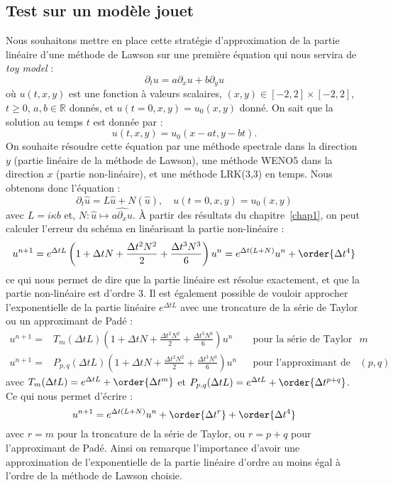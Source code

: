 \subsection{Test sur un modèle jouet}

Nous souhaitons mettre en place cette stratégie d'approximation de la partie linéaire d'une méthode de Lawson sur une première équation qui nous servira de \emph{toy model} :
$$
  \partial_t u = a\partial_x u + b\partial_y u
$$
où $u(t,x,y)$ est une fonction à valeurs scalaires, $(x,y)\in[-2,2]\times[-2,2]$, $t\geq0$, $a,b\in\mathbb{R}$ donnés, et $u(t=0,x,y)=u_0(x,y)$ donné. On sait que la solution au temps $t$ est donnée par :
$$
  u(t,x,y) = u_0(x-at,y-bt).
$$
On souhaite résoudre cette équation par une méthode spectrale dans la direction $y$ (partie linéaire de la méthode de Lawson), une méthode WENO5 dans la direction $x$ (partie non-linéaire), et une méthode LRK(3,3) en temps. Nous obtenons donc l'équation :
$$
  \partial_t \hat{u} = L\hat{u} + N(\hat{u}),\quad u(t=0,x,y) = u_0(x,y)
$$
avec $L = i\kappa b$ et, $N:\hat{u}\mapsto\widehat{a\partial_xu}$. À partir des résultats du chapitre~\ref{chap1}, on peut calculer l'erreur du schéma en linéarisant la partie non-linéaire :
$$
  u^{n+1} = e^{\Delta tL}\left(1+\Delta tN + \frac{\Delta t^2N^2}{2} + \frac{\Delta t^3N^3}{6}\right)u^n = e^{\Delta t (L+N)}u^n + \order{\Delta t^4}
$$
ce qui nous permet de dire que la partie linéaire est résolue exactement, et que la partie non-linéaire est d'ordre 3. Il est également possible de vouloir approcher l'exponentielle de la partie linéaire $e^{\Delta tL}$ avec une troncature de la série de Taylor ou un approximant de Padé :
$$
  \begin{aligned}
    u^{n+1} =& T_m(\Delta tL)\left(1+\Delta tN + \frac{\Delta t^2N^2}{2} + \frac{\Delta t^3N^3}{6}\right)u^n     & & \text{pour la série de Taylor d'ordre $m$} \\
    u^{n+1} =& P_{p,q}(\Delta tL)\left(1+\Delta tN + \frac{\Delta t^2N^2}{2} + \frac{\Delta t^3N^3}{6}\right)u^n & & \text{pour l'approximant de Padé d'ordre $(p,q)$}
  \end{aligned}
$$
avec $T_m(\Delta tL) = e^{\Delta tL}+\order{\Delta t^m}$ et $P_{p,q}(\Delta tL) = e^{\Delta tL}+\order{\Delta t^{p+q}}$. Ce qui nous permet d'écrire :
$$
  u^{n+1} = e^{\Delta t (L+N)}u^n + \order{\Delta t^r} + \order{\Delta t^4}
$$
avec $r=m$ pour la troncature de la série de Taylor, ou $r=p+q$ pour l'approximant de Padé. Ainsi on remarque l'importance d'avoir une approximation de l'exponentielle de la partie linéaire d'ordre au moins égal à l'ordre de la méthode de Lawson choisie.

